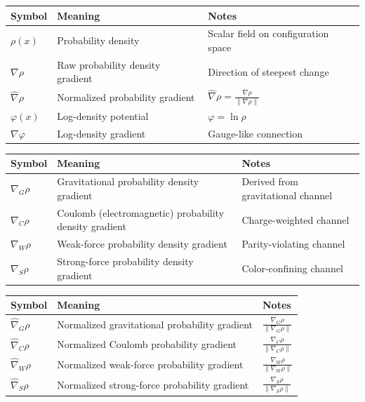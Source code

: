 
\begin{table}[h!]
\centering
\renewcommand{\arraystretch}{1.25}

\begin{tabular}{lll}
\hline
\textbf{Symbol} & \textbf{Meaning} & \textbf{Notes} \\
\hline
$\rho(x)$ & Probability density & Scalar field on configuration space \\
$\nabla \rho$ & Raw probability density gradient & Direction of steepest change \\
$\hat{\nabla}\rho$ & Normalized probability gradient & $\hat{\nabla}\rho = \frac{\nabla\rho}{\|\nabla\rho\|}$ \\
$\varphi(x)$ & Log-density potential & $\varphi = \ln \rho$ \\
$\nabla \varphi$ & Log-density gradient & Gauge-like connection \\
\hline
\end{tabular}

\vspace{1em}

\begin{tabular}{lll}
\hline
\textbf{Symbol} & \textbf{Meaning} & \textbf{Notes} \\
\hline
$\nabla_G \rho$ & Gravitational probability density gradient & Derived from gravitational channel \\
$\nabla_C \rho$ & Coulomb (electromagnetic) probability density gradient & Charge-weighted channel \\
$\nabla_W \rho$ & Weak-force probability density gradient & Parity-violating channel \\
$\nabla_S \rho$ & Strong-force probability density gradient & Color-confining channel \\
\hline
\end{tabular}

\vspace{1em}

\begin{tabular}{lll}
\hline
\textbf{Symbol} & \textbf{Meaning} & \textbf{Notes} \\
\hline
$\hat{\nabla}_G \rho$ & Normalized gravitational probability gradient & $\frac{\nabla_G \rho}{\|\nabla_G \rho\|}$ \\
$\hat{\nabla}_C \rho$ & Normalized Coulomb probability gradient & $\frac{\nabla_C \rho}{\|\nabla_C \rho\|}$ \\
$\hat{\nabla}_W \rho$ & Normalized weak-force probability gradient & $\frac{\nabla_W \rho}{\|\nabla_W \rho\|}$ \\
$\hat{\nabla}_S \rho$ & Normalized strong-force probability gradient & $\frac{\nabla_S \rho}{\|\nabla_S \rho\|}$ \\
\hline
\end{tabular}


\end{table}
